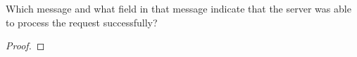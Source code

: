 \documentclass[../../main.tex]{subfiles}
\begin{document}
\begin{wts}
Which message and what field in that message indicate that the server was able to process the request successfully?  
\end{wts}
\begin{proof}

\end{proof}
\end{document}
